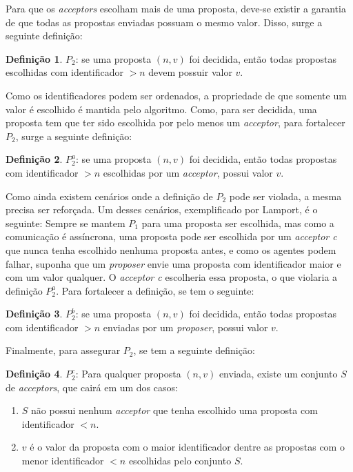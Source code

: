 \documentclass[12pt,
openright, 
oneside,
a4paper,
brazil]{facom-ufu-abntex2}
\theoremstyle{definition}
\newtheorem{definition}{Definição}
\begin{document}
Para que os \textit{acceptors} escolham mais de uma proposta, deve-se existir a garantia de
que todas as propostas enviadas possuam o mesmo valor. Disso, surge a seguinte definição:

\begin{definition}
$P_2$: se uma proposta $(n, v)$ foi decidida, então todas propostas escolhidas com 
identificador $>n$ devem possuir valor $v$.
\end{definition}

Como os identificadores podem ser ordenados, a propriedade de que somente um valor é escolhido
é mantida pelo algoritmo. Como, para ser decidida, uma proposta tem que ter sido escolhida
por pelo menos um \textit{acceptor}, para fortalecer $P_2$, surge a seguinte definição:

\begin{definition}
$P_2^a$: se uma proposta $(n, v)$ foi decidida, então todas propostas com identificador
$>n$ escolhidas por um \textit{acceptor}, possui valor $v$.
\end{definition}

Como ainda existem cenários onde a definição de $P_2$ pode ser violada, a mesma precisa ser
reforçada. Um desses cenários, exemplificado por Lamport, é o seguinte:
Sempre se mantem $P_1$ para uma proposta ser escolhida, mas como
a comunicação é assíncrona, uma proposta pode ser escolhida por um \textit{acceptor c} 
que nunca tenha escolhido nenhuma proposta antes, e como os agentes podem falhar, suponha
que um \textit{proposer} envie uma proposta com identificador maior e com um valor qualquer.
O \textit{acceptor c} escolheria essa proposta, o que violaria a definição $P_2^a$. Para
fortalecer a definição, se tem o seguinte:

\begin{definition}
$P_2^b$: se uma proposta $(n, v)$ foi decidida, então todas propostas com identificador
$>n$ enviadas por um \textit{proposer}, possui valor $v$.
\end{definition}

Finalmente, para assegurar $P_2$, se tem a seguinte definição:

\begin{definition}
$P_2^c$: Para qualquer proposta $(n, v)$ enviada, existe um conjunto $S$ de
\textit{acceptors}, que cairá em um dos casos:

\begin{enumerate}
    \item $S$ não possui nenhum \textit{acceptor} que tenha escolhido uma proposta com 
identificador $<n$.

    \item $v$ é o valor da proposta com o maior identificador dentre as propostas com o 
menor identificador $<n$ escolhidas pelo conjunto $S$.
\end{enumerate}
\end{definition}
\end{document}
